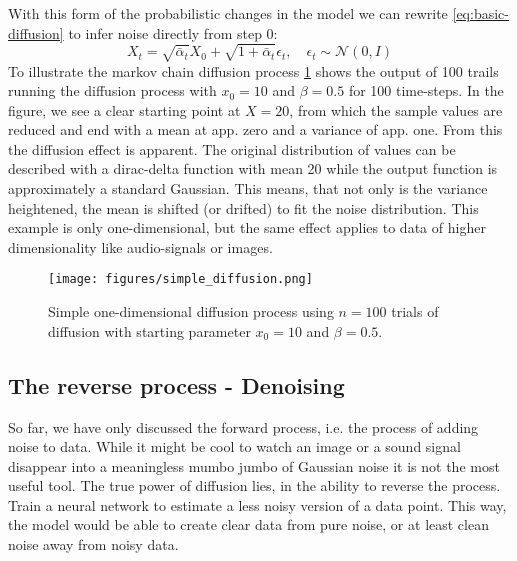 \documentclass[a4paper, 12pt]{olplainarticle}
\begin{document}
With this form of the probabilistic changes in the model we can rewrite \cref{eq:basic-diffusion} to infer noise directly from step 0:
\begin{equation} \label{eq:forward-process}
    X_t = \sqrt{\bar{\alpha}_t}X_0+\sqrt{1+\bar{\alpha}_t} \epsilon_t, \quad \epsilon_t \sim \mathcal{N}(0,I)
\end{equation}
To illustrate the markov chain diffusion process \cref{fig:diffusion-process} shows the output of 100 trails running the diffusion process with $x_0 = 10$ and $\beta = 0.5$ for 100 time-steps.
In the figure, we see a clear starting point at $X = 20$, from which the sample values are reduced and end with a mean at app. zero and a variance of app. one.
From this the diffusion effect is apparent. The original distribution of values can be described with a dirac-delta function with mean 20 while the output function is approximately a standard Gaussian.
This means, that not only is the variance heightened, the mean is shifted (or drifted) to fit the noise distribution.
This example is only one-dimensional, but the same effect applies to data of higher dimensionality like audio-signals or images.
\begin{figure}[tb]
    \centering
    \texttt{[image: figures/simple\_diffusion.png]}
    \caption{Simple one-dimensional diffusion process using $n=100$ trials of diffusion with starting parameter $x_0 = 10$ and $\beta = 0.5$.}
    \label{fig:diffusion-process}
\end{figure}

\subsection*{The reverse process - Denoising}

So far, we have only discussed the forward process, i.e. the process of adding noise to data. 
While it might be cool to watch an image or a sound signal disappear into a meaningless mumbo jumbo of Gaussian noise it is not the most useful tool.
The true power of diffusion lies, in the ability to reverse the process. Train a neural network to estimate a less noisy version of a data point.
This way, the model would be able to create clear data from pure noise, or at least clean noise away from noisy data.
\end{document}
